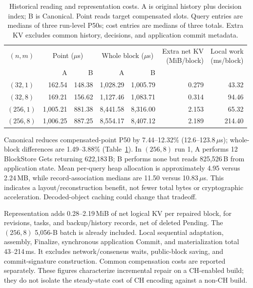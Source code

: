 \begin{table}[t]
  \caption{Historical reading and representation costs. A is original
    history plus decision index; B is Canonical. Point reads target
    compensated slots. Query entries are medians of three run-level
    P50s; cost entries are medians of three totals. Extra KV excludes
    common history, decisions, and application commit metadata.}
  \label{tab:eval-reader}
  \centering
  \small
  \setlength{\tabcolsep}{8pt}
  \begin{tabular}{@{}crrrrrr@{}}
    \toprule
    $(n,m)$ &
    \multicolumn{2}{c}{Point ($\mu$s)} &
    \multicolumn{2}{c}{Whole block ($\mu$s)} &
    \shortstack{Extra net KV\\(MiB/block)} &
    \shortstack{Local work\\(ms/block)} \\
    \cmidrule(lr){2-3}\cmidrule(lr){4-5}
    & A & B & A & B & & \\
    \midrule
    $(32,1)$  & 162.54  & 148.38 & 1,028.29 & 1,005.79 & 0.279 & 43.32 \\
    $(32,8)$  & 169.21  & 156.62 & 1,127.46 & 1,083.71 & 0.314 & 94.46 \\
    $(256,1)$ & 1,005.21 & 881.38 & 8,441.58 & 8,316.00 & 2.153 & 65.32 \\
    $(256,8)$ & 1,006.25 & 887.25 & 8,554.17 & 8,407.12 & 2.189 & 214.40 \\
    \bottomrule
  \end{tabular}
\end{table}

Canonical reduces compensated-point P50 by 7.44--12.32\%
(12.6--123.8\,$\mu$s); whole-block differences are 1.49--3.88\%
(Table~\ref{tab:eval-reader}). In $(256,8)$ run 1, A performs 12
BlockStore Gets returning 622,183\,B; B performs none but reads
825,526\,B from application state. Mean per-query heap allocation is approximately
4.95 versus 2.24\,MB, while record-association medians are
11.50 versus 10.83\,$\mu$s. This indicates a layout/reconstruction
benefit, not fewer total bytes or cryptographic acceleration.
Decoded-object caching could change that tradeoff.

Representation adds 0.28--2.19\,MiB of net logical KV per repaired
block, for revisions, tasks, and backup/history records, net of deleted Pending. The $(256,8)$ 5,056-B batch is already
included. Local sequential adaptation, assembly, Finalize, synchronous
application Commit, and materialization total 43--214\,ms.
It excludes network/consensus waits, public-block saving, and
commit-signature construction. Common compensation costs are reported separately.
These figures characterize incremental repair on a CH-enabled build;
they do not isolate the steady-state cost of CH encoding against a
non-CH build.



